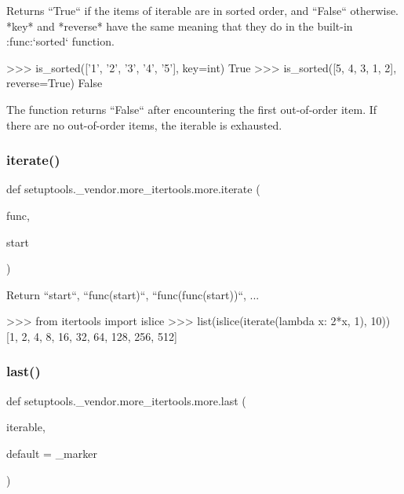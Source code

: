 \begin{DoxyVerb}Returns ``True`` if the items of iterable are in sorted order, and
``False`` otherwise. *key* and *reverse* have the same meaning that they do
in the built-in :func:`sorted` function.

>>> is_sorted(['1', '2', '3', '4', '5'], key=int)
True
>>> is_sorted([5, 4, 3, 1, 2], reverse=True)
False

The function returns ``False`` after encountering the first out-of-order
item. If there are no out-of-order items, the iterable is exhausted.
\end{DoxyVerb}
 \mbox{\label{namespacesetuptools_1_1__vendor_1_1more__itertools_1_1more_a03e89578244dcd6cc1bdb6e2399ad6f6}} 
\subsubsection{\texorpdfstring{iterate()}{iterate()}}
{\footnotesize\ttfamily def setuptools.\+\_\+vendor.\+more\+\_\+itertools.\+more.\+iterate (\begin{DoxyParamCaption}\item[{}]{func,  }\item[{}]{start }\end{DoxyParamCaption})}

\begin{DoxyVerb}Return ``start``, ``func(start)``, ``func(func(start))``, ...

>>> from itertools import islice
>>> list(islice(iterate(lambda x: 2*x, 1), 10))
[1, 2, 4, 8, 16, 32, 64, 128, 256, 512]\end{DoxyVerb}
 \mbox{\label{namespacesetuptools_1_1__vendor_1_1more__itertools_1_1more_a86971974b505201c4419bd8aad9d1866}} 
\subsubsection{\texorpdfstring{last()}{last()}}
{\footnotesize\ttfamily def setuptools.\+\_\+vendor.\+more\+\_\+itertools.\+more.\+last (\begin{DoxyParamCaption}\item[{}]{iterable,  }\item[{}]{default = {\ttfamily \+\_\+marker} }\end{DoxyParamCaption})}


